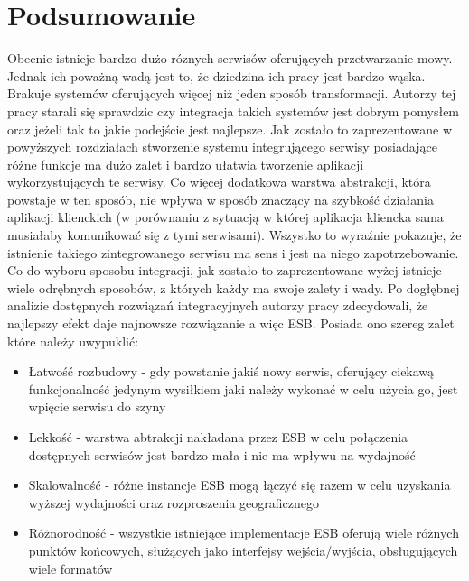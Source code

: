 
\chapter{Podsumowanie} %



\ifpdf
    \graphicspath{{7/figures/PNG/}{7/figures/PDF/}{7/figures/}}
\else
    \graphicspath{{7/figures/EPS/}{7/figures/}}
\fi

Obecnie istnieje bardzo dużo róznych serwisów oferujących przetwarzanie mowy. Jednak ich poważną wadą jest to, że dziedzina ich pracy jest bardzo wąska. Brakuje systemów oferujących więcej niż jeden sposób transformacji. Autorzy tej pracy starali się sprawdzic czy integracja takich systemów jest dobrym pomysłem oraz jeżeli tak to jakie podejście jest najlepsze. Jak zostało to zaprezentowane w powyższych rozdziałach stworzenie systemu integrującego serwisy posiadające różne funkcje ma dużo zalet i bardzo ułatwia tworzenie aplikacji wykorzystujących te serwisy. Co więcej dodatkowa warstwa abstrakcji, która powstaje w ten sposób, nie wpływa w sposób znaczący na szybkość działania aplikacji klienckich (w porównaniu z sytuacją w której aplikacja kliencka sama musiałaby komunikować się z tymi serwisami). Wszystko to wyraźnie pokazuje, że istnienie takiego zintegrowanego serwisu ma sens i jest na niego zapotrzebowanie. \\
Co do wyboru sposobu integracji, jak zostało to zaprezentowane wyżej istnieje wiele odrębnych sposobów, z których każdy ma swoje zalety i wady. Po dogłębnej analizie dostępnych rozwiązań integracyjnych autorzy pracy zdecydowali, że najlepszy efekt daje najnowsze rozwiązanie a więc ESB. Posiada ono szereg zalet które należy uwypuklić:
\begin{itemize}
	\item Łatwość rozbudowy - gdy powstanie jakiś nowy serwis, oferujący ciekawą funkcjonalność jedynym wysiłkiem jaki należy wykonać w celu użycia go, jest wpięcie serwisu do szyny
	\item Lekkość - warstwa abtrakcji nakładana przez ESB w celu połączenia dostępnych serwisów jest bardzo mała i nie ma wpływu na wydajność
	\item Skalowalność - różne instancje ESB mogą łączyć się razem w celu uzyskania wyższej wydajności oraz rozproszenia geograficznego
	\item Różnorodność - wszystkie istniejące implementacje ESB oferują wiele różnych punktów końcowych, służących jako interfejsy wejścia/wyjścia, obsługujących wiele formatów
\end{itemize}
